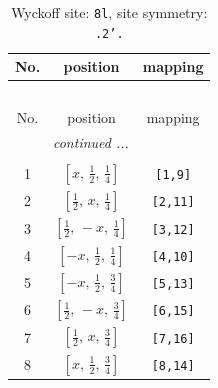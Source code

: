 \documentclass[fleqn,8pt]{jsarticle}
\begin{document}
\begin{longtable}{ccc}
\caption{Wyckoff site: {\tt 8l}, site symmetry: {\tt .2'.}}
 \\
 \hline \hline
No. & position & mapping \\ \hline \endfirsthead

\multicolumn{2}{l}{\tablename\ \thetable{}} \\
 \hline \hline
No. & position & mapping \\ \hline \endhead

 \hline \hline
\multicolumn{2}{r}{\footnotesize\it continued ...} \\ \endfoot

 \hline \hline
\multicolumn{2}{r}{} \\ \endlastfoot

1 & $\left[ x,\, \frac{1}{2},\, \frac{1}{4} \right]$ & {\tt [1,9]} \\ \hline
2 & $\left[ \frac{1}{2},\, x,\, \frac{1}{4} \right]$ & {\tt [2,11]} \\ \hline
3 & $\left[ \frac{1}{2},\, - x,\, \frac{1}{4} \right]$ & {\tt [3,12]} \\ \hline
4 & $\left[ - x,\, \frac{1}{2},\, \frac{1}{4} \right]$ & {\tt [4,10]} \\ \hline
5 & $\left[ - x,\, \frac{1}{2},\, \frac{3}{4} \right]$ & {\tt [5,13]} \\ \hline
6 & $\left[ \frac{1}{2},\, - x,\, \frac{3}{4} \right]$ & {\tt [6,15]} \\ \hline
7 & $\left[ \frac{1}{2},\, x,\, \frac{3}{4} \right]$ & {\tt [7,16]} \\ \hline
8 & $\left[ x,\, \frac{1}{2},\, \frac{3}{4} \right]$ & {\tt [8,14]} \\
\end{longtable}
\renewcommand{\arraystretch}{1.2}
\end{document}
